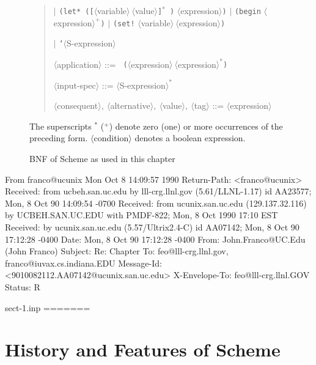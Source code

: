 \begin{figure}
\begin{frameit}
\begin{quote}
\indent\indent $\vert$ {\small\tt (let*
 ([}$\langle$variable$\rangle~\langle$value$\rangle${\small\tt ]}$^*${\small\tt
 )} $\langle$expression$\rangle${\small\tt )}\hfil\break
\indent\indent $\vert$ {\small\tt (begin} $\langle$expression$\rangle
 ^+${\small\tt )}\hfil\break
\indent\indent $\vert$ {\small\tt (set!}
 $\langle$variable$\rangle~\langle$expression$\rangle${\small\tt )}\hfil\break

\indent\indent $\vert$ {\small\tt '}$\langle$S-expression$\rangle$\hfil\break

\vskip 10pt

\indent $\langle$application$\rangle$ ::= {\small\tt
 (}$\langle$expression$\rangle~
\langle$expression$\rangle ^*${\small\tt )}\hfil\break

\vskip 10pt

\indent $\langle$input-spec$\rangle$ ::= $\langle$S-expression$\rangle ^*$
\hfil\break

\vskip 10pt

\indent $\langle$consequent$\rangle ,~\langle$alternative$\rangle
 ,~\langle$value$\rangle ,~\langle$tag$\rangle$ ::=
 $\langle$expression$\rangle$\hfil\break
\end{quote}
\caption{BNF of Scheme as used in this chapter}
\vskip 6pt
\noindent
The superscripts $^*$ ($^+$) denote zero (one) or more occurrences of
the preceding form.  $\langle$condition$\rangle$ denotes a boolean
expression.
\label{fig:BNF}
\end{frameit}
\end{figure}

From franco@ucunix Mon Oct  8 14:09:57 1990
Return-Path: <franco@ucunix>
Received: from ucbeh.san.uc.edu by lll-crg.llnl.gov (5.61/LLNL-1.17)
	id AA23577; Mon, 8 Oct 90 14:09:54 -0700
Received: from ucunix.san.uc.edu (129.137.32.116) by UCBEH.SAN.UC.EDU with
 PMDF-822; Mon, 8 Oct 1990 17:10 EST
Received: by ucunix.san.uc.edu (5.57/Ultrix2.4-C) id AA07142; Mon, 8 Oct 90
 17:12:28 -0400
Date: Mon, 8 Oct 90 17:12:28 -0400
From: John.Franco@UC.Edu (John Franco)
Subject: Re:  Chapter
To: feo@lll-crg.llnl.gov, franco@iuvax.cs.indiana.EDU
Message-Id: <9010082112.AA07142@ucunix.san.uc.edu>
X-Envelope-To: feo@lll-crg.llnl.GOV
Status: R

sect-1.inp
=======

\section{History and Features of Scheme}

